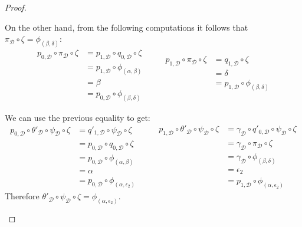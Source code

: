 \documentclass[a4paper,UKenglish,cleveref,pdftex,thm-restate,numberwithinsect]{lipics-v2021}
\begin{document}
\begin{proof}
\begin{enumerate}
\begin{itemize}
				On the other hand, from the following computations it follows that $\pi_{\mathcal{D}}\circ \zeta=\phi_{(\beta, \delta)}$:
				\[\begin{split}
				p_{0, \mathcal{D}}\circ \pi_{\mathcal{D}}\circ \zeta&=p_{1, \mathcal{D}}\circ q_{0, \mathcal{D}}\circ \zeta\\&= p_{1, \mathcal{D}}\circ \phi_{(\alpha, \beta)}\\&=\beta\\&=p_{0, \mathcal{D}}\circ \phi_{(\beta, \delta)}
				\end{split}\qquad \begin{split}
				p_{1, \mathcal{D}}\circ \pi_{\mathcal{D}}\circ \zeta &= q_{1, \mathcal{D}}\circ \zeta\\&=\delta \\&= p_{1, \mathcal{D}}\circ \phi_{(\beta, \delta)}\\&
				\end{split}\]
				
				We can use the previous equality to get:
					\[\begin{split}
					p_{0, \mathcal{D}}\circ \theta'_{\mathcal{D}}\circ \psi_{\mathcal{D}} \circ \zeta &= q'_{1, \mathcal{D}}\circ \psi_{\mathcal{D}}\circ \zeta\\&=p_{0, \mathcal{D}}\circ q_{0, \mathcal{D}} \circ \zeta\\&= p_{0, \mathcal{D}}\circ \phi_{(\alpha, \beta)}\\&=\alpha\\&=p_{0, \mathcal{D}}\circ \phi_{(\alpha, \epsilon_2)}
				\end{split} \qquad 
				\begin{split}p_{1, \mathcal{D}}\circ \theta'_{\mathcal{D}} \circ \psi_{\mathcal{D}}\circ \zeta &=\gamma_{\mathcal{D}}\circ q'_{0, \mathcal{D}}\circ \psi_{\mathcal{D}}\circ \zeta\\&=\gamma_{\mathcal{D}}\circ \pi_{\mathcal{D}}\circ \zeta\\&=\gamma_{\mathcal{D}}\circ \phi_{(\beta, \delta)}\\&=\epsilon_2\\&=p_{1, \mathcal{D}}\circ \phi_{(\alpha, \epsilon_2)}
				\end{split}\]
				Therefore $ \theta'_{\mathcal{D}}\circ \psi_{\mathcal{D}}\circ \zeta = \phi_{(\alpha, \epsilon_2)}$.
				

\end{itemize}
\end{enumerate}
\end{proof}
\end{document}
